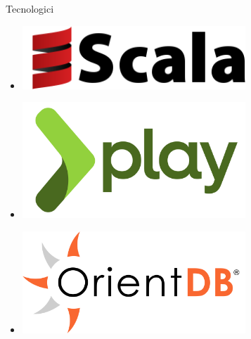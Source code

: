 \begin{frame}[t]
\begin{minipage}[t]{.32\textwidth}
\begin{itemize}
\end{itemize}
\end{minipage}
\vrule{}
\begin{minipage}[t]{.32\textwidth}
Tecnologici
\begin{itemize}
\item[] \includegraphics[width=0.66\textwidth]{img/scala-logo}
\item[] \includegraphics[width=0.66\textwidth]{img/play-logo}
\item[] \includegraphics[width=0.66\textwidth]{img/orientdb-logo}
\end{itemize}
\end{minipage}
\end{frame}